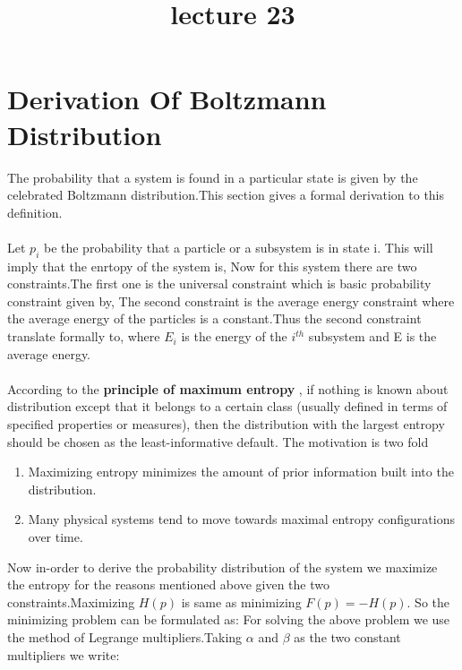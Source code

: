 \documentclass[letterpaper,english,10pt]{article}
\title{lecture 23}
\begin{document}
\maketitle

\section{Derivation Of Boltzmann Distribution}

The probability that a system is found in a particular state is given by the celebrated Boltzmann distribution.This section gives a formal derivation to this definition.\\\\
Let $p_i$ be the probability that a particle or a subsystem is in state i. This will imply that the enrtopy of the system is,
Now for this system there are two constraints.The first one is the universal constraint which is basic probability constraint given by,
The second constraint is the average energy constraint where the average energy of the particles is a constant.Thus the second constraint translate formally to,
where $E_i$ is the energy of the $i^{th}$ subsystem and E is the average energy.\\\\
According to the \textbf{principle of maximum entropy} , if nothing is known about
distribution except that it belongs to a certain class (usually defined in terms of specified
properties or measures), then the distribution with the largest entropy should be chosen as
the least-informative default. The motivation is two fold
\begin{enumerate}
    \item Maximizing entropy minimizes the amount of prior information built into the distribution.
    \item Many physical systems tend to move towards maximal entropy configurations over time.
\end{enumerate}
Now in-order to derive the probability distribution of the system we maximize the entropy for
the reasons mentioned above given the two constraints.Maximizing $H(p)$ is same as minimizing
$F(p)=-H(p)$. So the minimizing problem can be formulated as:
For solving the above problem we use the method of Legrange multipliers.Taking $\alpha$ and
$\beta$ as the two constant multipliers we write:
\end{document}
